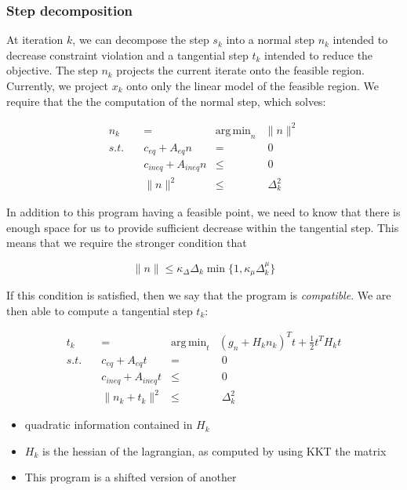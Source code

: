\documentclass{article}
\DeclareMathOperator*{\argmin}{arg\,min}
\begin{document}
\subsubsection{Step decomposition}
At iteration $k$, we can decompose the step $s_k$ into a normal step $n_k$ intended to decrease constraint violation and a tangential step $t_k$ intended to reduce the objective.
The step $n_k$ projects the current iterate onto the feasible region.
Currently, we project $x_k$ onto only the linear model of the feasible region.
We require that the the computation of the normal step, which solves:

\begin{align*}
n_k &=& \argmin_n           & \|n\|^2 \\
s.t. \quad & c_{eq} + A_{eq}n     &=&\; 0 \\
     & c_{ineq} + A_{ineq}n &\le& \; 0  \\
     & \| n \|^2            &\le& \; \Delta_k^2
\end{align*}

In addition to this program having a feasible point, we need to know that there is enough space for us to provide sufficient decrease within the tangential step. This means that we require the stronger condition that

$$\|n\|\le \kappa_{\Delta} \Delta_k \min \{1, \kappa_{\mu}\Delta_k^{\mu}\}$$

If this condition is satisfied, then we say that the program is \emph{compatible}. We are then able to compute a tangential step $t_k$:

\begin{align*}
t_k &=& \argmin_t           & (g_n+H_kn_k)^Tt + \frac 1 2 t^T H_k t \\
s.t. \quad & c_{eq} + A_{eq}t	&=& \; 0 \\
     & c_{ineq} + A_{ineq}t	&\le& \; 0  \\
     & \| n_k + t_k \|^2 		&\le& \; \Delta_k ^2
\end{align*}

\begin{itemize}
\item quadratic information contained in $H_k$
\item $H_k$ is the hessian of the lagrangian, as computed by using KKT the matrix
\item This program is a shifted version of another
\end{itemize}

\end{document}

